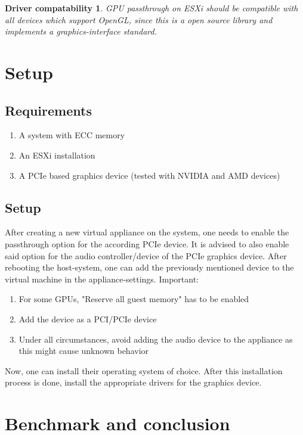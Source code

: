 \documentclass[12pt,a4paper]{report}
\newtheorem*{theorem2}{Driver compatability}
\begin{document}
\begin{theorem2}
GPU passthrough on ESXi should be compatible with all devices which support OpenGL, since this is a open source library and implements a graphics-interface standard.
\end{theorem2}

\chapter{Setup}

\section{Requirements}

\begin{enumerate}
\item A system with ECC memory
\item An ESXi installation
\item A PCIe based graphics device (tested with NVIDIA and AMD devices)
\end{enumerate}

\section{Setup}

After creating a new virtual appliance on the system, one needs to enable the passthrough option for the according PCIe device. It is advised to also enable said option for the audio controller/device of the PCIe graphics device. After rebooting the host-system, one can add the previously mentioned device to the virtual machine in the appliance-settings.
\newline
Important:
\begin{enumerate}
\item For some GPUs, "Reserve all guest memory" has to be enabled
\item Add the device as a PCI/PCIe device
\item Under all circumstances, avoid adding the audio device to the appliance as this might cause unknown behavior
\end{enumerate}
Now, one can install their operating system of choice. After this installation process is done, install the appropriate drivers for the graphics device.

\chapter{Benchmark and conclusion}
\end{document}
